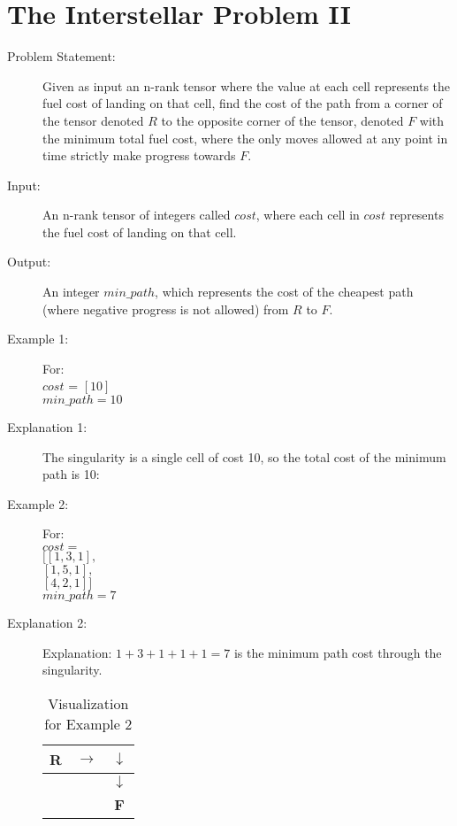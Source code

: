 \section{The Interstellar Problem II}
\begin{description}
    \item[Problem Statement:]
    Given as input an n-rank tensor where the value at each cell represents the fuel cost of landing on that cell, find the cost of the path from a corner of the tensor denoted $R$ to the opposite corner of the tensor,
    denoted $F$ with the minimum total fuel cost, where the only moves allowed at any point in time strictly make progress towards $F$.
        
    \item[Input:]
    An n-rank tensor of integers called $cost$, where each cell in $cost$ represents the fuel cost of landing on that cell.
        
    \item[Output:] 
    An integer $min\_path$, which represents the cost of the cheapest path (where negative progress is not allowed) from $R$ to $F$.
        
    \item[Example 1:] For:\\
    $cost$ = $[10]$\\
    $min\_path = 10$
    \item[Explanation 1:]
    The singularity is a single cell of cost 10, so the total cost of the minimum path is 10:

    \item[Example 2:] For:\\
    $cost = $\\
    $[[1,3,1],$\\
    $[1,5,1],$\\
    $[4,2,1]]$\\
    $min\_path = 7$

    \item[Explanation 2:]
        Explanation: $1 + 3 + 1 + 1 + 1 = 7$ is the minimum path cost through the singularity.
        \begin{table}[H]
            \centering
            \begin{tabular}{|c|c|c|}
                \hline
                \textbf{R} & $\rightarrow$ & $\downarrow$ \\
                \hline
                 &  & $\downarrow$ \\
                \hline
                 &  & \textbf{F} \\
                \hline
            \end{tabular}
            \caption{Visualization for Example 2}
        \end{table}
\end{description}

